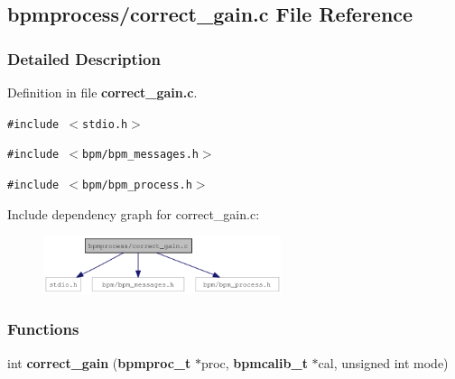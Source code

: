\subsection{bpmprocess/correct\_\-gain.c File Reference}
\label{correct__gain_8c}


\subsubsection{Detailed Description}


Definition in file {\bf correct\_\-gain.c}.

{\tt \#include $<$stdio.h$>$}\par
{\tt \#include $<$bpm/bpm\_\-messages.h$>$}\par
{\tt \#include $<$bpm/bpm\_\-process.h$>$}\par


Include dependency graph for correct\_\-gain.c:\nopagebreak
\begin{figure}[H]
\begin{center}
\leavevmode
\includegraphics[width=197pt]{correct__gain_8c__incl}
\end{center}
\end{figure}
\subsubsection*{Functions}
\begin{CompactItemize}
\item 
int {\bf correct\_\-gain} ({\bf bpmproc\_\-t} $\ast$proc, {\bf bpmcalib\_\-t} $\ast$cal, unsigned int mode)
\end{CompactItemize}
